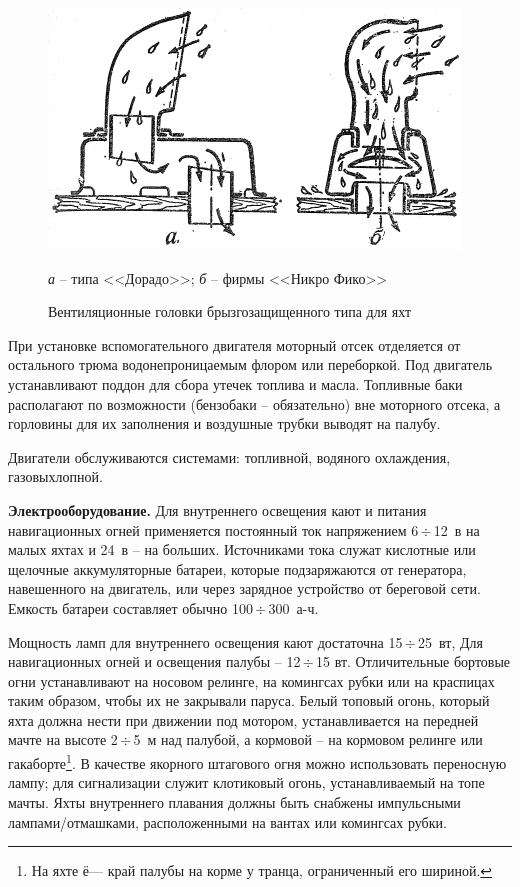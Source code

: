 \documentclass[a4paper, 12pt, twoside, final, book, russian, fittopage, cyremdash]{ncc}
\newcommand{\otdo}{\,\ensuremath{\div}\,}
\begin{document}
\begin{figure}[htb]
  \centering
  \includegraphics[scale=1.2]{0038P}
  \caption{Вентиляционные головки брызгозащищенного типа для яхт}
  \label{fig:38}
  \small
  \centering{}
  \textit{а} \--- типа <<Дорадо>>; \textit{б} \--- фирмы <<Никро Фико>>
\end{figure}

При установке вспомогательного двигателя моторный отсек отделяется от остального трюма водонепроницаемым флором или переборкой. Под двигатель устанавливают поддон для сбора утечек топлива и масла. Топливные баки располагают по возможности (бензобаки \--- обязательно) вне моторного отсека, а горловины для их заполнения и воздушные трубки выводят на палубу. 

Двигатели обслуживаются системами: топливной, водяного охлаждения, газовыхлопной. 

\textbf{Электрооборудование.} Для внутреннего освещения кают и питания навигационных огней применяется постоянный ток напряжением 6\otdo 12~в на малых яхтах и 24~в \--- на больших. Источниками тока служат кислотные или щелочные аккумуляторные батареи, которые подзаряжаются от генератора, навешенного на двигатель, или через зарядное устройство от береговой сети. Емкость батареи составляет обычно 100\otdo 300~а-ч. 

Мощность ламп для внутреннего освещения кают достаточна 15\otdo 25~вт, Для навигационных огней и освещения палубы \--- 12\otdo 15 вт. Отличительные бортовые огни устанавливают на носовом релинге, на комингсах рубки или на краспицах таким образом, чтобы их не закрывали паруса. Белый топовый огонь, который яхта должна нести при движении под мотором, устанавливается на передней мачте на высоте 2\otdo 5~м над палубой, а кормовой \--- на кормовом релинге или гакаборте\footnote{На яхте ё--- край палубы на корме у транца, ограниченный его шириной.}. В качестве якорного штагового огня можно использовать переносную лампу; для сигнализации служит клотиковый огонь, устанавливаемый на топе мачты. Яхты внутреннего плавания должны быть снабжены импульсными лампами\-/отмашками, расположенными на вантах или комингсах рубки. 
\end{document}
